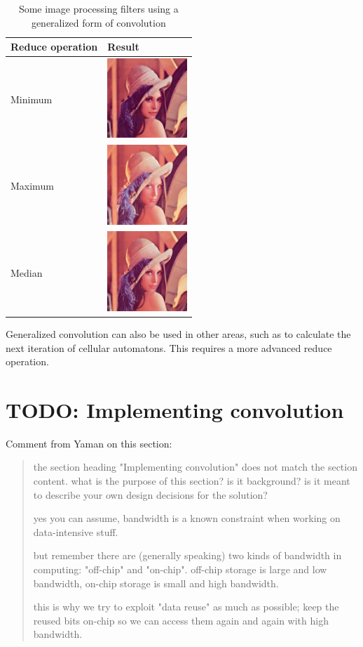 \begin{table}

    \begin{tabular}{lm{3cm}}
        Reduce operation & Result \\
        \hline
        Minimum & \includegraphics[width=3cm]{img/LenaMin} \\
        Maximum & \includegraphics[width=3cm]{img/LenaMax} \\
        Median & \includegraphics[width=3cm]{img/LenaMedian}
    \end{tabular}

    \caption{Some image processing filters using a generalized form of convolution}
    \label{tab:GeneralizedKernelMatrices}

\end{table}

Generalized convolution can also be used in other areas, such as to calculate the next iteration of cellular automatons. This requires a more advanced reduce operation.

\section{TODO: Implementing convolution}
Comment from Yaman on this section:
\begin{quotation}
the section heading "Implementing convolution" does not match the section content. what is the purpose of this section? is it background? is it meant to describe your own design decisions for the solution?

yes you can assume, bandwidth is a known constraint when working on data-intensive stuff.

but remember there are (generally speaking) two kinds of bandwidth in computing: "off-chip" and "on-chip". off-chip storage is large and low bandwidth, on-chip storage is small and high bandwidth. 

this is why we try to exploit "data reuse" as much as possible; keep the reused bits on-chip so we can access them again and again with high bandwidth.
\end{quotation}


